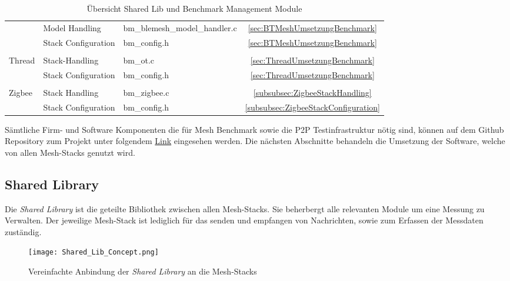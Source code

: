 \begin{table}
\begin{tabular}{|l|l|l|c|}
\cline{2-4}
& Model Handling & bm\_blemesh\_model\_handler.c & \ref{sec:BTMeshUmsetzungBenchmark} \\ 
\cline{2-4}
 & Stack Configuration & bm\_config.h & \ref{sec:BTMeshUmsetzungBenchmark} \\ 
\hline
\multicolumn{1}{l}{} & \multicolumn{1}{l}{} & \multicolumn{1}{l}{} & \multicolumn{1}{l}{} \\ 
\hline
\multirow{2}{*}{Thread} & Stack-Handling & bm\_ot.c & \ref{sec:ThreadUmsetzungBenchmark} \\ 
\cline{2-4}
 & Stack Configuration & bm\_config.h & \ref{sec:ThreadUmsetzungBenchmark} \\ 
\hline
\multicolumn{1}{l}{} & \multicolumn{1}{l}{} & \multicolumn{1}{l}{} & \multicolumn{1}{l}{} \\ 
\hline
\multirow{2}{*}{Zigbee} & Stack Handling & bm\_zigbee.c & \ref{subsubsec:ZigbeeStackHandling} \\ 
\cline{2-4}
 & Stack Configuration & bm\_config.h & \ref{subsubsec:ZigbeeStackConfiguration} \\
\hline
\end{tabular}
\caption{Übersicht Shared Lib und Benchmark Management Module}
\label{tab:UebersichtSoftware}
\end{table}


Sämtliche Firm- und Software Komponenten die für Mesh Benchmark sowie die P2P Testinfrastruktur nötig sind, können auf dem Github Repository zum Projekt unter folgendem \href{https://github.com/Rouben94/P6_Software}{Link\footnotemark[\value{footnote}]}  eingesehen werden. Die nächsten Abschnitte behandeln die Umsetzung der Software, welche von allen Mesh-Stacks genutzt wird.


\subsection{Shared Library}\label{subsec:SharedLibrary}

Die \textit{Shared Library} ist die geteilte Bibliothek zwischen allen Mesh-Stacks. Sie beherbergt alle relevanten Module um eine Messung zu Verwalten. Der jeweilige Mesh-Stack ist lediglich für das senden und empfangen von Nachrichten, sowie zum Erfassen der Messdaten zuständig. 


\begin{figure}[H]
	\centering
	\texttt{[image: Shared\_Lib\_Concept.png]}
	\caption{Vereinfachte Anbindung der \textit{Shared Library} an die Mesh-Stacks}\label{fig:ShardeLibConcept}
\end{figure}

